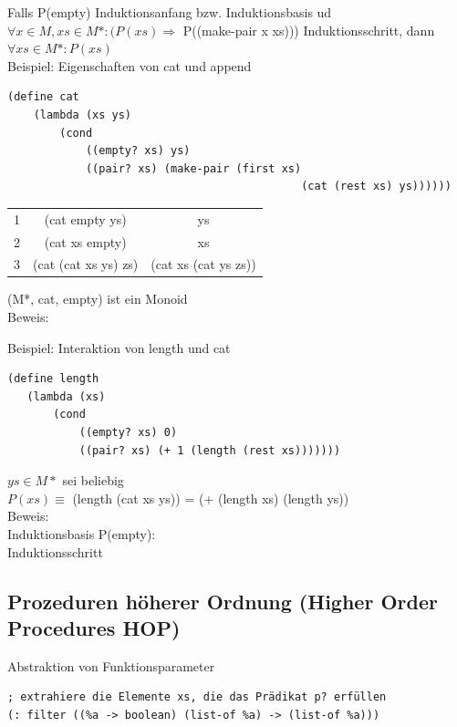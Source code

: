 \documentclass[paper=a4, fontsize=11pt]{scrartcl}
\numberwithin{equation}{section}
\numberwithin{figure}{section}
\numberwithin{table}{section}
\begin{document}
\begin{lstlistig}
 Falls P(empty) Induktionsanfang bzw. Induktionsbasis ud $\forall x \in M, xs \in M*: (P(xs) \Rightarrow $ P((make-pair x xs))) Induktionsschritt, dann $\forall xs \in M*: P(xs)$ \\
 
 Beispiel: Eigenschaften von cat und append
\begin{lstlisting}
(define cat
    (lambda (xs ys)
        (cond
            ((empty? xs) ys)
            ((pair? xs) (make-pair (first xs)
                                             (cat (rest xs) ys))))))
\end{lstlisting}

\begin{tabular}{ccc}
1 & (cat empty ys) & ys\\
2 & (cat xs empty) & xs \\
3 & (cat (cat xs ys) zs) & (cat xs (cat ys zs)) \\
\end{tabular}
 
 (M*, cat, empty) ist ein Monoid \\
 
 Beweis: \\
 \hfill \box
 
 Beispiel: Interaktion von length und cat
\begin{lstlisting}
(define length
   (lambda (xs)
       (cond
           ((empty? xs) 0)
           ((pair? xs) (+ 1 (length (rest xs)))))))
\end{lstlisting}

$ys \in M*$ sei beliebig \\
$P(xs) \equiv$ (length (cat xs ys)) = (+ (length xs) (length ys)) \\

Beweis: \\ 
Induktionsbasis P(empty): \\

Induktionsschritt


\hfill \box
\subsection{Prozeduren höherer Ordnung (Higher Order Procedures HOP)}
Abstraktion von Funktionsparameter \\
\begin{lstlisting}
; extrahiere die Elemente xs, die das Prädikat p? erfüllen
(: filter ((%a -> boolean) (list-of %a) -> (list-of %a)))


\end{lstlisting}
\end{lstlistig}
\end{document}
